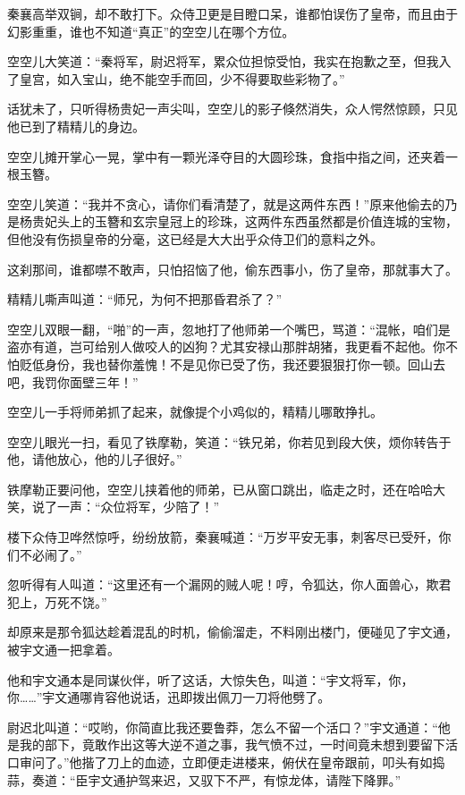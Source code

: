 \documentclass[12pt,oneside]{book}
\begin{document}
秦襄高举双锏，却不敢打下。众侍卫更是目瞪口呆，谁都怕误伤了皇帝，而且由于幻影重重，谁也不知道``真正''的空空儿在哪个方位。

空空儿大笑道：``秦将军，尉迟将军，累众位担惊受怕，我实在抱歉之至，但我入了皇宫，如入宝山，绝不能空手而回，少不得要取些彩物了。''

话犹未了，只听得杨贵妃一声尖叫，空空儿的影子倏然消失，众人愕然惊顾，只见他已到了精精儿的身边。

空空儿摊开掌心一晃，掌中有一颗光泽夺目的大圆珍珠，食指中指之间，还夹着一根玉簪。

空空儿笑道：``我并不贪心，请你们看清楚了，就是这两件东西！''原来他偷去的乃是杨贵妃头上的玉簪和玄宗皇冠上的珍珠，这两件东西虽然都是价值连城的宝物，但他没有伤损皇帝的分毫，这已经是大大出乎众侍卫们的意料之外。

这刹那间，谁都噤不敢声，只怕招恼了他，偷东西事小，伤了皇帝，那就事大了。

精精儿嘶声叫道：``师兄，为何不把那昏君杀了？''

空空儿双眼一翻，``啪''的一声，忽地打了他师弟一个嘴巴，骂道：``混帐，咱们是盗亦有道，岂可给别人做咬人的凶狗？尤其安禄山那胖胡猪，我更看不起他。你不怕贬低身份，我也替你羞愧！不是见你已受了伤，我还要狠狠打你一顿。回山去吧，我罚你面壁三年！''

空空儿一手将师弟抓了起来，就像提个小鸡似的，精精儿哪敢挣扎。

空空儿眼光一扫，看见了铁摩勒，笑道：``铁兄弟，你若见到段大侠，烦你转告于他，请他放心，他的儿子很好。''

铁摩勒正要问他，空空儿挟着他的师弟，已从窗口跳出，临走之时，还在哈哈大笑，说了一声：``众位将军，少陪了！''

楼下众侍卫哗然惊呼，纷纷放箭，秦襄喊道：``万岁平安无事，刺客尽已受歼，你们不必闹了。''

忽听得有人叫道：``这里还有一个漏网的贼人呢！哼，令狐达，你人面兽心，欺君犯上，万死不饶。''

却原来是那令狐达趁着混乱的时机，偷偷溜走，不料刚出楼门，便碰见了宇文通，被宇文通一把拿着。

他和宇文通本是同谋伙伴，听了这话，大惊失色，叫道：``宇文将军，你，你\ldots\ldots{}''宇文通哪肯容他说话，迅即拨出佩刀一刀将他劈了。

尉迟北叫道：``哎哟，你简直比我还要鲁莽，怎么不留一个活口？''宇文通道：``他是我的部下，竟敢作出这等大逆不道之事，我气愤不过，一时间竟未想到要留下活口审问了。''他揩了刀上的血迹，立即便走进楼来，俯伏在皇帝跟前，叩头有如捣蒜，奏道：``臣宇文通护驾来迟，又驭下不严，有惊龙体，请陛下降罪。''
\end{document}
